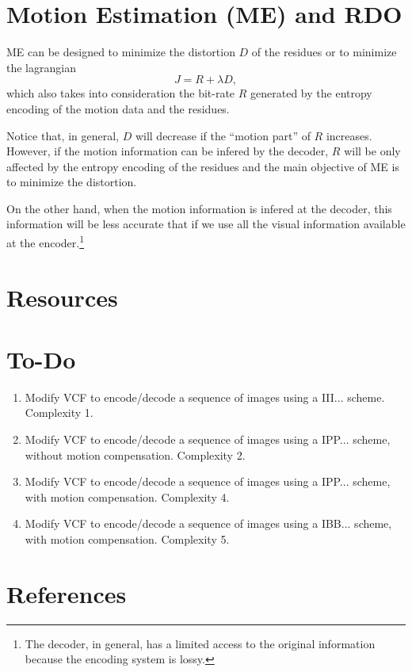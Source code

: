 
\section{Motion Estimation (ME) and RDO}

ME can be designed to minimize the distortion $D$ of the residues or
to minimize the lagrangian
\begin{equation}
  J = R + \lambda D,
\end{equation}
which also takes into consideration the bit-rate $R$ generated by the
entropy encoding of the motion data and the residues.

Notice that, in general, $D$ will decrease if the ``motion part'' of
$R$ increases. However, if the motion information can be infered by
the decoder, $R$ will be only affected by the entropy encoding of the
residues and the main objective of ME is to minimize the distortion.

On the other hand, when the motion information is infered at the
decoder, this information will be less accurate that if we use all the
visual information available at the encoder.\footnote{The decoder, in
general, has a limited access to the original information because the
encoding system is lossy.}


\section{Resources}

\section{To-Do}

\begin{enumerate}
\item Modify VCF to encode/decode a sequence of images using a
  III... scheme. Complexity 1.
\item Modify VCF to encode/decode a sequence of images using a
  IPP... scheme, without motion compensation. Complexity 2.
\item Modify VCF to encode/decode a sequence of images using a
  IPP... scheme, with motion compensation. Complexity 4.
\item Modify VCF to encode/decode a sequence of images using a
  IBB... scheme, with motion compensation. Complexity 5.
\end{enumerate}

  
\section{References}

\renewcommand{\addcontentsline}[3]{}%


